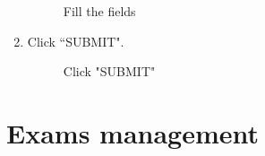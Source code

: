 \documentclass[ManualeUtente]{subfiles}
\begin{document}
\begin{enumerate}
\begin{figure}[H]
		\caption{Fill the fields}
		\label{fig:Fill the fields}
	\end{figure}
	\item Click \textquotedblleft SUBMIT".
	\begin{figure}[H]
		\centering
		\caption{Click "SUBMIT"}
		\label{fig:Click "SUBMIT"}
	\end{figure}
\end{enumerate}

\section{Exams management}
\end{document}
